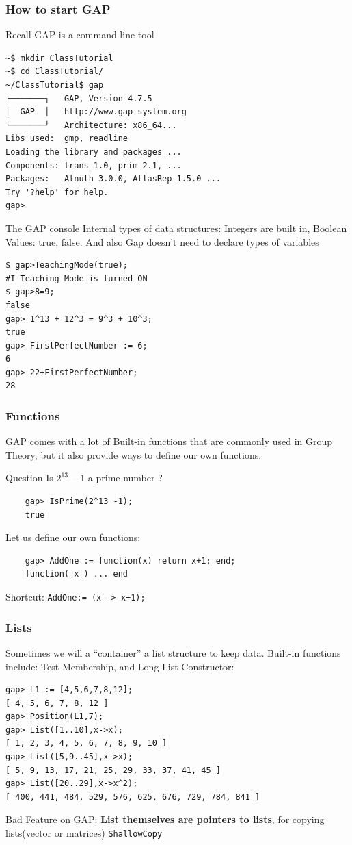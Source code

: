 \documentclass{beamer}
\theoremstyle{definition}
\theoremstyle{remark}
\begin{document}
\LogoOff
\begin{frame}[fragile]
\frametitle{How to start GAP}
Recall GAP is a command line tool
\begin{verbatim}
~$ mkdir ClassTutorial
~$ cd ClassTutorial/
~/ClassTutorial$ gap
┌───────┐   GAP, Version 4.7.5
│  GAP  │   http://www.gap-system.org
└───────┘   Architecture: x86_64...
Libs used:  gmp, readline
Loading the library and packages ...
Components: trans 1.0, prim 2.1, ...
Packages:   Alnuth 3.0.0, AtlasRep 1.5.0 ...
Try '?help' for help. 
gap>
\end{verbatim}
\end{frame}
\LogoOn
\begin{frame}[fragile]{The GAP console}
Internal types of data structures: Integers are built in, Boolean Values: true, false. And also Gap doesn't need to declare types of variables 
\begin{verbatim}
$ gap>TeachingMode(true);
#I Teaching Mode is turned ON
$ gap>8=9;
false
gap> 1^13 + 12^3 = 9^3 + 10^3;
true
gap> FirstPerfectNumber := 6;
6
gap> 22+FirstPerfectNumber;
28
\end{verbatim}

\end{frame}
\begin{frame}[fragile]
	\frametitle{Functions}
	GAP comes with a lot of Built-in functions that are commonly used in Group Theory, but it also provide ways to define our own functions.
	\begin{block}{Question}
		Is $ 2^{13} -1 $ a prime number ?
	\end{block}
	\pause
	\begin{verbatim}
	gap> IsPrime(2^13 -1);
	true
	\end{verbatim}
	\pause
	Let us define our own functions:
	\begin{verbatim}
	gap> AddOne := function(x) return x+1; end;
	function( x ) ... end
	\end{verbatim}
	Shortcut: \texttt{AddOne:= (x -> x+1);}
\end{frame}
\begin{frame}[fragile]
	\frametitle{Lists}
	Sometimes we will a ``container'' a list structure to keep data. Built-in functions include: Test Membership, and Long List Constructor:
\begin{verbatim}
gap> L1 := [4,5,6,7,8,12];
[ 4, 5, 6, 7, 8, 12 ]
gap> Position(L1,7);
gap> List([1..10],x->x);
[ 1, 2, 3, 4, 5, 6, 7, 8, 9, 10 ]
gap> List([5,9..45],x->x);
[ 5, 9, 13, 17, 21, 25, 29, 33, 37, 41, 45 ]
gap> List([20..29],x->x^2);
[ 400, 441, 484, 529, 576, 625, 676, 729, 784, 841 ]
\end{verbatim}
	Bad Feature on GAP: \textbf{List themselves are pointers to lists}, for copying lists(vector or matrices) \texttt{ShallowCopy}
\end{frame}
\end{document}
